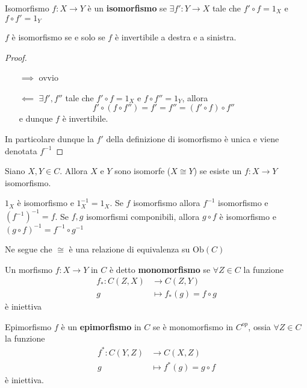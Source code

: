 \begin{definition}{Isomorfismo}
    \(f : X \to Y\) è un \textbf{isomorfismo} se \(\exists f' : Y \to X\) tale che \(f'
    \circ f = 1_X\) e \(f \circ f' = 1_Y\) 
\end{definition}
\begin{remark}{}
    \(f\) è isomorfismo se e solo se \(f\) è invertibile a destra e a sinistra. 
\end{remark}
\begin{proof}\( \)
\begin{itemize}
    \item[\(\implies \)] ovvio
    \item[\(\impliedby \)] \(\exists f', f''\) tale che \(f' \circ f = 1_X\)  e
        \(f \circ f'' = 1_Y\), allora
        \[
          f' \circ {( f \circ f'')} = f' = f'' = {(f' \circ f)} \circ f''
        \]
        e dunque \(f\) è invertibile.
\end{itemize}
    In particolare dunque la \(f'\) della definizione di isomorfismo è unica e
    viene denotata \(f^{-1}\) 
\end{proof}

\begin{definition}{}
    Siano \(X, Y \in C\). Allora \(X\) e \(Y\) sono isomorfe (\(X \cong Y\)) se
    esiste un \(f: X \to Y\) isomorfismo.
\end{definition}

\begin{remark}{}
    \(1_X\) è isomorfismo e \(1_X^{-1} = 1_X\). Se \(f\) isomorfismo
    allora \(f^{-1}\) isomorfismo e \({(f^{-1})}^{-1} = f\). Se \(f, g\)
    isomorfismi componibili, allora \(g \circ f\) è isomorfismo e \({(g \circ f)}^{-1} = f^{-1} \circ g^{-1}\) 

    Ne segue che \(\cong\) è una relazione di equivalenza su \(\mathrm{Ob}{(C)}\) 
\end{remark}

\begin{definition}{}
    Un morfismo \(f : X \to Y\) in \(C\) è detto \textbf{monomorfismo} se \(\forall Z \in C\) la funzione 
    \begin{align*}
        f_*: C{(Z, X)} &\longrightarrow C{(Z, Y)} \\
        g &\longmapsto f_*(g) = f \circ g
    \end{align*}
    è iniettiva
\end{definition}
\begin{definition}{Epimorfismo}
    \(f\) è un \textbf{epimorfismo} in \(C\) se è monomorfismo in \(C^{op}\),
    ossia \(\forall Z \in C\) la funzione
    \begin{align*}
        f^*: C{(Y, Z)} &\longrightarrow C{(X, Z)} \\
        g &\longmapsto f^*(g) = g \circ f
    \end{align*}
    è iniettiva.
\end{definition}

